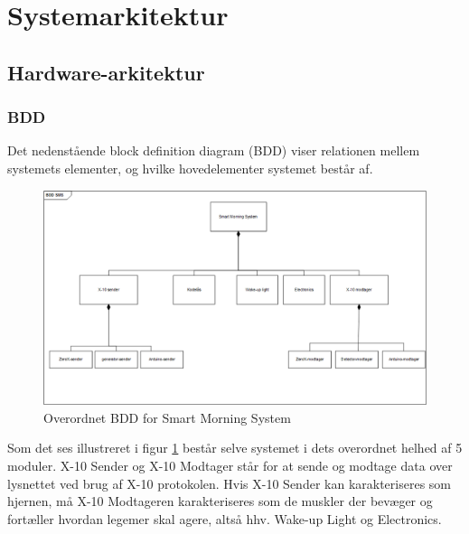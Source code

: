 \documentclass[11pt]{article}
\begin{document}
\section{Systemarkitektur}
\subsection{Hardware-arkitektur}

\subsubsection{BDD}

Det nedenstående block definition diagram (BDD) viser relationen mellem systemets elementer, og hvilke hovedelementer systemet består af.

\begin{figure}[H]
\centering
\includegraphics[width=\textwidth]{Bdd-sms-uden.png}
\caption{Overordnet BDD for Smart Morning System}
\label{fig: Overordnet_BDD_uden_ports}
\end{figure}

Som det ses illustreret i figur \ref{fig: Overordnet_BDD_uden_ports} består selve systemet i dets overordnet helhed af 5 moduler. X-10 Sender og X-10 Modtager står for at sende og modtage data over lysnettet ved brug af X-10 protokolen. Hvis X-10 Sender kan karakteriseres som hjernen, må X-10 Modtageren karakteriseres som de muskler der bevæger og fortæller hvordan legemer skal agere, altså hhv. Wake-up Light og Electronics.\pagebreak
\end{document}
